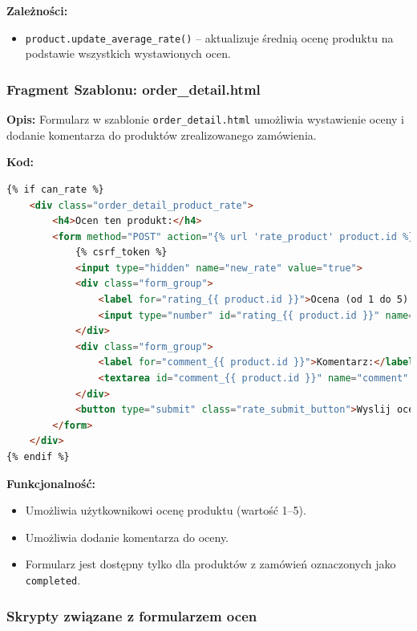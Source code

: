 \documentclass[12pt,a4paper,oneside]{article}
\theoremstyle{definition}
\numberwithin{equation}{section}
\begin{document}
\textbf{Zależności:}
\begin{itemize}
    \item \texttt{product.update\_average\_rate()} – aktualizuje średnią ocenę produktu na podstawie wszystkich wystawionych ocen.
\end{itemize}

\subsubsection*{Fragment Szablonu: order_detail.html }

\textbf{Opis:}  
Formularz w szablonie \texttt{order\_detail.html} umożliwia wystawienie oceny i dodanie komentarza do produktów zrealizowanego zamówienia.

\textbf{Kod:}
\begin{lstlisting}[language=HTML]
{% if can_rate %}
    <div class="order_detail_product_rate">
        <h4>Ocen ten produkt:</h4>
        <form method="POST" action="{% url 'rate_product' product.id %}" class="rating_form">
            {% csrf_token %}
            <input type="hidden" name="new_rate" value="true">
            <div class="form_group">
                <label for="rating_{{ product.id }}">Ocena (od 1 do 5):</label>
                <input type="number" id="rating_{{ product.id }}" name="value" min="1" max="5" required>
            </div>
            <div class="form_group">
                <label for="comment_{{ product.id }}">Komentarz:</label>
                <textarea id="comment_{{ product.id }}" name="comment" rows="3"></textarea>
            </div>
            <button type="submit" class="rate_submit_button">Wyslij ocene</button>
        </form>
    </div>
{% endif %}
\end{lstlisting}

\textbf{Funkcjonalność:}
\begin{itemize}
    \item Umożliwia użytkownikowi ocenę produktu (wartość 1–5).
    \item Umożliwia dodanie komentarza do oceny.
    \item Formularz jest dostępny tylko dla produktów z zamówień oznaczonych jako \texttt{completed}.
\end{itemize}



\subsubsection{Skrypty związane z formularzem ocen}
\end{document}
